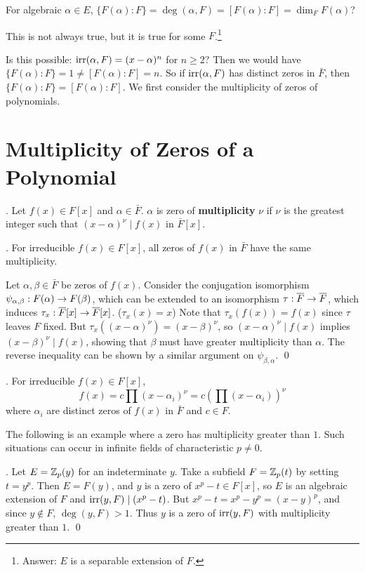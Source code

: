 \question For algebraic \(\alpha \in E\), \(\{F(\alpha) : F\} = \deg(\alpha, F) = [F(\alpha) : F] = \dim_F F(\alpha)\)?

This is not always true, but it is true for some \(F\).\footnote{Answer: \(E\) is a separable extension of \(F\).}

\pagebreak


Is this possible: \(\mathrm{irr}(\alpha, F) = (x - \alpha)^n\) for \(n \geq 2\)? Then we would have \(\{F(\alpha) : F\} = 1 \neq [F(\alpha) : F] = n\). So if \(\mathrm{irr}(\alpha, F)\) has distinct zeros in \(\bar{F}\), then \(\{F(\alpha) : F\} = [F(\alpha) : F]\). We first consider the multiplicity of zeros of polynomials.

\section*{Multiplicity of Zeros of a Polynomial}

.  Let \(f(x) \in F[x]\) and \(\alpha \in \bar{F}\). \(\alpha\) is zero of \textbf{multiplicity} \(\nu\) if \(\nu\) is the greatest integer such that \((x - \alpha)^\nu \mid f(x)\) in \(\bar{F}[x]\).

\thm. For irreducible \(f(x) \in F[x]\), all zeros of \(f(x)\) in \(\bar{F}\) have the same multiplicity.

\pf Let \(\alpha, \beta \in \bar{F}\) be zeros of \(f(x)\). Consider the conjugation isomorphism \(\psi_{\alpha, \beta} : F(\alpha) \rightarrow F(\beta)\), which can be extended to an isomorphism \(\tau : \bar{F} \ra \bar{F}\), which induces \(\tau_x : \bar{F}[x] \ra \bar{F}[x]\). (\(\tau_x(x) = x\)) Note that \(\tau_x(f(x)) = f(x)\) since \(\tau\) leaves \(F\) fixed. But \(\tau_x((x-\alpha)^\nu) = (x-\beta)^\nu\), so \((x - \alpha)^\nu \mid f(x)\) implies \((x - \beta)^\nu \mid f(x)\), showing that \(\beta\) must have greater multiplicity than \(\alpha\). The reverse inequality can be shown by a similar argument on \(\psi_{\beta, \alpha}\). \qed

\cor. For irreducible \(f(x) \in F[x]\),
\[
    f(x) = c \prod (x - \alpha_i)^\nu = c \left(\prod (x - \alpha_i)\right)^\nu
\]
where \(\alpha_i\) are distinct zeros of \(f(x)\) in \(\bar{F}\) and \(c \in F\).

The following is an example where a zero has multiplicity greater than \(1\). Such situations can occur in infinite fields of characteristic \(p \neq 0\).

\ex. Let \(E = \mathbb{Z}_p(y)\) for an indeterminate \(y\). Take a subfield \(F = \mathbb{Z}_p(t)\) by setting \(t = y^p\). Then \(E = F(y)\), and \(y\) is a zero of \(x^p - t \in F[x]\), so \(E\) is an algebraic extension of \(F\) and \(\mathrm{irr}(y, F) \mid (x^p -t)\).  But \(x^p - t = x^p - y^p = (x - y)^p\), and since \(y \notin F\), \(\deg(y, F) > 1\). Thus \(y\) is a zero of \(\mathrm{irr}(y, F)\) with multiplicity greater than \(1\). \qed

\smallskip
